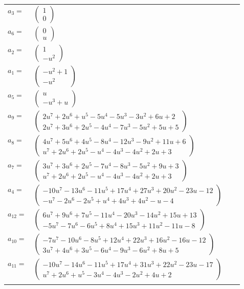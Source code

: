 \documentclass[1p]{elsarticle_modified}
\theoremstyle{definition}
\begin{document}
\begin{tabular}{m{7pt} m{180pt} m{7pt} m{180pt} }
\flushright $a_{3}=$&$\begin{pmatrix}1\\0\end{pmatrix}$ \\
\flushright $a_{6}=$&$\begin{pmatrix}0\\u\end{pmatrix}$ \\
\flushright $a_{2}=$&$\begin{pmatrix}1\\- u^2\end{pmatrix}$ \\
\flushright $a_{1}=$&$\begin{pmatrix}- u^2+1\\- u^2\end{pmatrix}$ \\
\flushright $a_{5}=$&$\begin{pmatrix}u\\- u^3+u\end{pmatrix}$ \\
\flushright $a_{9}=$&$\begin{pmatrix}2 u^7+2 u^6+u^5-5 u^4-5 u^3-3 u^2+6 u+2\\2 u^7+3 u^6+2 u^5-4 u^4-7 u^3-5 u^2+5 u+5\end{pmatrix}$ \\
\flushright $a_{8}=$&$\begin{pmatrix}4 u^7+5 u^6+4 u^5-8 u^4-12 u^3-9 u^2+11 u+6\\u^7+2 u^6+2 u^5- u^4-4 u^3-4 u^2+2 u+3\end{pmatrix}$ \\
\flushright $a_{7}=$&$\begin{pmatrix}3 u^7+3 u^6+2 u^5-7 u^4-8 u^3-5 u^2+9 u+3\\u^7+2 u^6+2 u^5- u^4-4 u^3-4 u^2+2 u+3\end{pmatrix}$ \\
\flushright $a_{4}=$&$\begin{pmatrix}-10 u^7-13 u^6-11 u^5+17 u^4+27 u^3+20 u^2-23 u-12\\- u^7-2 u^6-2 u^5+u^4+4 u^3+4 u^2- u-4\end{pmatrix}$ \\
\flushright $a_{12}=$&$\begin{pmatrix}6 u^7+9 u^6+7 u^5-11 u^4-20 u^3-14 u^2+15 u+13\\-5 u^7-7 u^6-6 u^5+8 u^4+15 u^3+11 u^2-11 u-8\end{pmatrix}$ \\
\flushright $a_{10}=$&$\begin{pmatrix}-7 u^7-10 u^6-8 u^5+12 u^4+22 u^3+16 u^2-16 u-12\\3 u^7+4 u^6+3 u^5-6 u^4-9 u^3-6 u^2+8 u+5\end{pmatrix}$ \\
\flushright $a_{11}=$&$\begin{pmatrix}-10 u^7-14 u^6-11 u^5+17 u^4+31 u^3+22 u^2-23 u-17\\u^7+2 u^6+u^5-3 u^4-4 u^3-2 u^2+4 u+2\end{pmatrix}$\\&\end{tabular}
\end{document}
